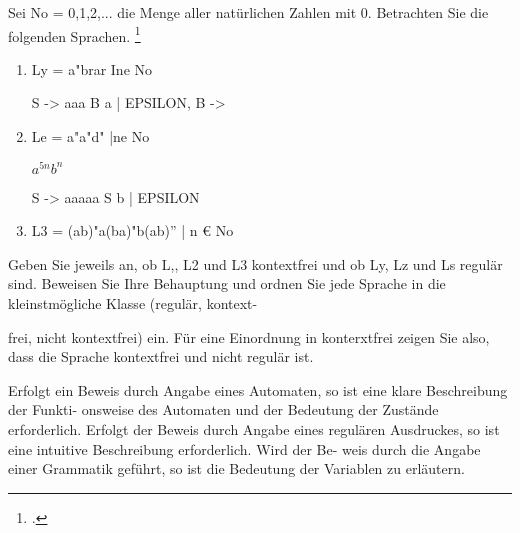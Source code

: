 \documentclass{lehramt-informatik-aufgabe}
\begin{document}

Sei No = {0,1,2,...} die Menge aller natürlichen Zahlen mit 0.
Betrachten Sie die folgenden Sprachen.
\footcite{examen:46115:2021:03}
\begin{enumerate}


\item Ly = {a"brar Ine No}

\begin{liAntwort}
\begin{liProduktionsRegeln}
S -> aaa B a | EPSILON,
B ->
\end{liProduktionsRegeln}
\end{liAntwort}


\item Le = {a"a"d" |ne No}

\begin{liAntwort}
$a^{5n} b^{n}$

\begin{liProduktionsRegeln}
S -> aaaaa S b | EPSILON
\end{liProduktionsRegeln}
\end{liAntwort}


\item L3 = {(ab)"a(ba)"b(ab)” | n € No}

\end{enumerate}

Geben Sie jeweils an, ob L,, L2 und L3 kontextfrei und ob Ly, Lz und Ls
regulär sind. Beweisen Sie Ihre Behauptung und ordnen Sie jede Sprache
in die kleinstmögliche Klasse (regulär, kontext-

frei, nicht kontextfrei) ein. Für eine Einordnung in konterxtfrei zeigen
Sie also, dass die Sprache kontextfrei und nicht regulär ist.

Erfolgt ein Beweis durch Angabe eines Automaten, so ist eine klare
Beschreibung der Funkti- onsweise des Automaten und der Bedeutung der
Zustände erforderlich. Erfolgt der Beweis durch Angabe eines regulären
Ausdruckes, so ist eine intuitive Beschreibung erforderlich. Wird der
Be- weis durch die Angabe einer Grammatik geführt, so ist die Bedeutung
der Variablen zu erläutern.
\end{document}
